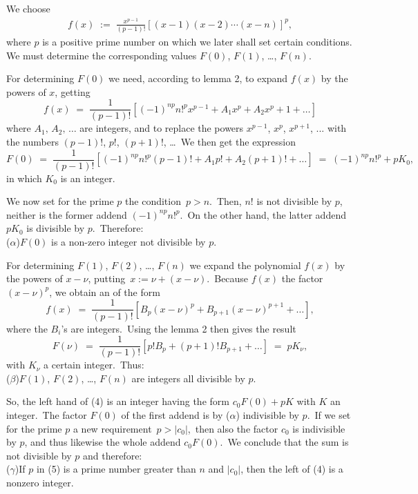\documentclass[12pt]{article}
\theoremstyle{definition}
\begin{document}
We choose
\begin{align}
f(x) \;:=\; \frac{x^{p-1}}{(p-1)!}[(x\!-\!1)(x\!-\!2)\cdots(x\!-\!n)]^p,
\end{align}
where $p$ is a positive prime number on which we later shall set certain conditions.\, We must determine the corresponding values $F(0)$, $F(1)$, \ldots, $F(n)$.

For determining $F(0)$ we need, according to lemma 2, to expand $f(x)$ by the powers of $x$, getting
$$f(x) \;=\; \frac{1}{(p\!-\!1)!}[(-1)^{np}n!^px^{p-1}+A_1x^p+A_2x^p+1+\ldots]$$
where $A_1,\,A_2,\,\ldots$ are integers, and to replace the powers $x^{p-1}$, $x^p$, $x^{p+1}$, ... with the numbers $(p\!-\!1)!$, $p!$, $(p\!+\!1)!$, \ldots\, We then get the expression
$$F(0) \;=\; \frac{1}{(p\!-\!1)!}[(-1)^{np}n!^p(p\!-\!1)!+A_1p!+A_2(p\!+\!1)!+\ldots] 
\;=\; (-1)^{np}n!^p+pK_0,$$
in which $K_0$ is an integer.

We now set for the prime $p$ the condition\, $p > n$.\, Then, $n!$ is not divisible by $p$, neither is the former addend $(-1)^{np}n!^p$.\, On the other hand, the latter addend $pK_0$ is divisible by $p$.\, Therefore:\\
($\alpha$)\quad $F(0)$ is a non-zero integer not divisible by $p$.

For determining $F(1)$, $F(2)$, \ldots, $F(n)$ we expand the polynomial $f(x)$ by the powers of $x\!-\!\nu$, putting \,$x := \nu\!+\!(x\!-\!\nu)$.\, Because $f(x)$  the factor $(x\!-\!\nu)^p$, we obtain an  of the form
$$f(x) \;=\;
\frac{1}{(p\!-\!1)!}[B_p(x\!-\!\nu)^p+B_{p+1}(x\!-\!\nu)^{p+1}+\ldots],$$
where the $B_i$'s are integers.\, Using the lemma 2 then gives the result
$$F(\nu) \;=\; \frac{1}{(p\!-\!1)!}[p!B_p+(p\!+\!1)!B_{p+1}+\ldots] \;=\; pK_{\nu},$$
with $K_{\nu}$ a certain integer.\, Thus:\\
($\beta$)\quad $F(1)$, $F(2)$, \ldots, $F(n)$ are integers all divisible by $p$.

So, the left hand  of (4) is an integer having the form $c_0F(0)+pK$ with $K$ an integer.\, The factor $F(0)$ of the first addend is by ($\alpha$) indivisible by $p$.\, If we set for the prime $p$ a new requirement\, $p > |c_0|$,\, then also the factor $c_0$ is indivisible by $p$, and thus likewise the whole addend $c_0F(0)$.\, We conclude that the sum is not divisible by $p$ and therefore:\\
($\gamma$)\quad If $p$ in (5) is a prime number greater than $n$ and $|c_0|$, then the left  of (4) is a nonzero integer.
\end{document}
